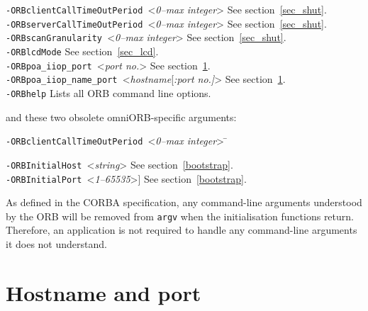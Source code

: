 \documentclass[11pt,twoside,a4paper]{book}
\newcommand{\code}[1]{\texttt{#1}}
\newcommand{\cmdline}[1]{\texttt{#1}}
\begin{document}
\begin{tabbing}
\cmdline{-ORBclientCallTimeOutPeriod }<\textit{0--max integer}>
                                         \> See section~\ref{sec_shut}.\\

\cmdline{-ORBserverCallTimeOutPeriod }<\textit{0--max integer}>
                                         \> See section~\ref{sec_shut}.\\

\cmdline{-ORBscanGranularity }<\textit{0--max integer}>
                                         \> See section~\ref{sec_shut}.\\

\cmdline{-ORBlcdMode}                    \> See section~\ref{sec_lcd}.\\

\cmdline{-ORBpoa\_iiop\_port }<\textit{port no.}>
                                         \> See section~\ref{sec:nameport}.\\

\cmdline{-ORBpoa\_iiop\_name\_port }<\textit{hostname}[\textit{:port no.]}>
                                         \> See section~\ref{sec:nameport}.\\

\cmdline{-ORBhelp}                     \> Lists all ORB command line options.

\end{tabbing}

\noindent and these two obsolete omniORB-specific arguments:

\begin{tabbing}
\cmdline{-ORBclientCallTimeOutPeriod }<\textit{0--max integer}> \=\kill

\cmdline{-ORBInitialHost }<\textit{string}>
                                         \> See section~\ref{bootstrap}.\\

\cmdline{-ORBInitialPort }<\textit{1--65535}>]
                                         \> See section~\ref{bootstrap}.

\end{tabbing}


\noindent As defined in the CORBA specification, any command-line
arguments understood by the ORB will be removed from \code{argv} when
the initialisation functions return. Therefore, an application is not
required to handle any command-line arguments it does not understand.



\section{Hostname and port}
\label{sec:nameport}
\end{document}

